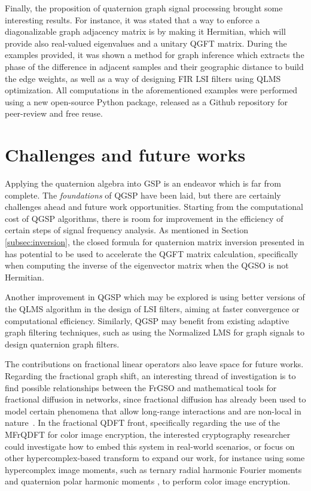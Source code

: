 Finally, the proposition of quaternion graph signal processing brought some interesting results. For instance, it was stated that a way to enforce a diagonalizable graph adjacency matrix is by making it Hermitian, which will provide also real-valued eigenvalues and a unitary QGFT matrix. During the examples provided, it was shown a method for graph inference which extracts the phase of the difference in adjacent samples and their geographic distance to build the edge weights, as well as a way of designing FIR LSI filters using QLMS optimization. All computations in the aforementioned examples were performed using a new open-source Python package, released as a Github repository for peer-review and free reuse.

\section{Challenges and future works}

Applying the quaternion algebra into GSP is an endeavor which is far from complete. The \textit{foundations} of QGSP have been laid, but there are certainly challenges ahead and future work opportunities. Starting from the computational cost of QGSP algorithms, there is room for improvement in the efficiency of certain steps of signal frequency analysis. As mentioned in Section \ref{subsec:inversion}, the closed formula for quaternion matrix inversion presented in \cite{cohen1999quaternionic} has potential to be used to accelerate the QGFT matrix calculation, specifically when computing the inverse of the eigenvector matrix when the QGSO is not Hermitian.

Another improvement in QGSP which may be explored is using better versions of the QLMS algorithm \cite{ogunfunmi2015adaptive} in the design of LSI filters, aiming at faster convergence or computational efficiency. Similarly, QGSP may benefit from existing adaptive graph filtering techniques, such as using the Normalized LMS for graph signals \cite{spelta2020normalized} to design quaternion graph filters.

The contributions on fractional linear operators also leave space for future works. Regarding the fractional graph shift, an interesting thread of investigation is to find possible relationships between the FrGSO and mathematical tools for fractional diffusion in networks, since fractional diffusion has already been used to model certain phenomena that allow long-range interactions and are non-local in nature~\cite{ilic2005,riascos2014,estrada2021,antil2021}. In the fractional QDFT front, specifically regarding the use of the MFrQDFT for color image encryption, the interested cryptography researcher could investigate how to embed this system in real-world scenarios, or focus on other hypercomplex-based transform to expand our work, for instance using some hypercomplex image moments, such as ternary radial harmonic Fourier moments and quaternion polar harmonic moments \cite{wang2019ternary,wang2018quaternion}, to perform color image encryption.
